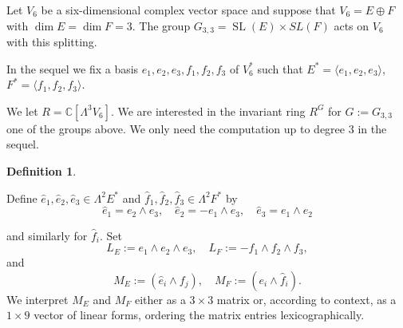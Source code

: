 \documentclass[11pt]{amsart}
\theoremstyle{plain}
\numberwithin{equation}{section}
\theoremstyle{definition}
\newtheorem{definition}[theorem]{Definition}
\theoremstyle{remark}
\DeclareMathOperator{\SL}{SL}
\begin{document}
Let $V_6$ be a six-dimensional complex vector space and suppose that $V_6=E\oplus F$ with $\dim E=\dim F=3.$ The group $G_{3,3}=\SL(E)\times SL(F)$ acts on $V_6$ with this splitting.




In the sequel we fix a basis $e_1, e_2, e_3, f_1, f_2, f_3$ of $V_6^*$ such that $E^*  =\langle e_1,e_2, e_3\rangle$,  $F^* = \langle f_1, f_2, f_3\rangle$. 

We let $R= \mathbb{C}[\Lambda^3 V_6]$. We are interested in the invariant ring $R^G$ for $G:=G_{3,3}$ one of the groups above. We only need the computation up to degree $3$ in the sequel. 

\newcommand{\hate}{\widehat{e}}
\newcommand{\hatf}{\widehat{f}}
\newcommand{\hatu}{\widehat{u}}

\begin{definition}\label{dInvariants33}

Define $\hate_1, \hate_2, \hate_3 \in \Lambda^2 E^*$  and $\hatf_1,\hatf_2,\hatf_3 \in \Lambda^2 F^*$ by 
\[
    \hate_1 = e_2 \wedge e_3, \quad %
    \hate_2 = -e_1 \wedge e_3, \quad%
    \hate_3 = e_1 \wedge e_2 
\]
 
and similarly for $\hatf_i$. Set
\[
L_E :=e_1\wedge e_2\wedge e_3, \quad
L_F :=-f_1\wedge f_2\wedge f_3,
\]
and 
\[
M_E := (\hate_i \wedge f_j), \quad %
M_F := (e_i \wedge \hatf_i).  %
\]
We interpret $M_E$ and $M_F$ either as a $3 \times 3$ matrix or, according to context, as a $1 \times 9$ vector of linear forms, ordering the matrix entries lexicographically. 
\end{definition}
\end{document}
